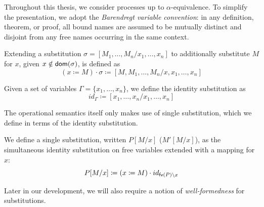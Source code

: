 \begin{convention}
  Throughout this thesis, we consider processes up to $\alpha$-equivalence.
  To simplify the presentation, we adopt the
  \emph{Barendregt variable convention}: in any definition, theorem, or proof, all bound names are
  assumed to be mutually distinct and disjoint from any free names occurring in the same context.
\end{convention}

\begin{definition} \label{def:pi-fd:subst-cons}
  Extending a substitution $\sigma = [M_1, \hdots, M_n/x_1, \hdots, x_n]$
  to additionally substitute $M$ for $x$, given $x \notin \mathsf{dom}(\sigma)$, is
  defined as
  \[
    (x \coloneq M) \cdot \sigma \coloneq [M, M_1, \hdots, M_n/x, x_1, \hdots, x_n]
  \]
\end{definition}

\begin{definition} \label{def:pi-fd:id-subst}
  Given a set of variables $\Gamma = \{x_1, \hdots, x_n\}$, we define
  the identity substitution as
  \[
    id_\Gamma \coloneq [x_1, \hdots, x_n/x_1, \hdots, x_n]
  \]
\end{definition}

The operational semantics itself only makes use of single substitution, which
we define in terms of the identity substitution.

\begin{definition}
  We define a single substitution, written $P[M/x]$ ($M'[M/x]$),
  as the simultaneous identity substitution on free variables extended with a mapping for $x$:
  \[
    P[M/x] \coloneq (x \coloneq M) \cdot id_{\mathsf{fv}(P) \setminus x}
  \]
\end{definition}

Later in our development, we will also require a notion of \emph{well-formedness}
for substitutions.

